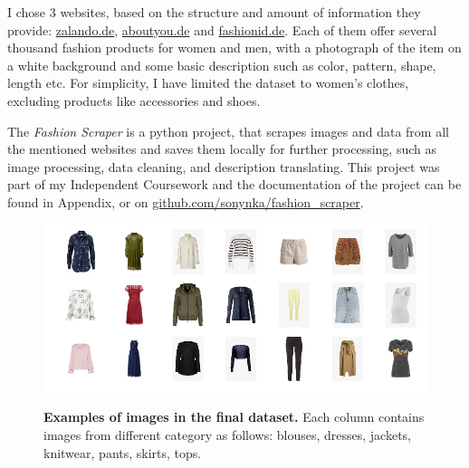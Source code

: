 \documentclass[12pt]{report}
\begin{document}
I chose 3 websites, based on the structure and amount of information they provide: \href{https://www.zalando.de/damen-home/}{zalando.de}, \href{https://www.aboutyou.de/}{aboutyou.de} and \href{https://www.fashionid.de/damen/}{fashionid.de}. Each of them offer several thousand fashion products for women and men, with a photograph of the item on a white background and some basic description such as color, pattern, shape, length etc. For simplicity, I have limited the dataset to women's clothes, excluding products like accessories and shoes.

The \textit{Fashion Scraper} is a python project, that scrapes images and data from all the mentioned websites and saves them locally for further processing, such as image processing, data cleaning, and description translating. This project was part of my Independent Coursework and the documentation of the project can be found in Appendix, or on \href{https://github.com/sonynka/fashion_scraper}{github.com/sonynka/fashion\_scraper}.

\begin{figure}[h]
\centering
{\includegraphics[width=\linewidth]{03_analysis/data/img_grid2}}
\caption{\label{fig:dataset} \textbf{Examples of images in the final dataset.} Each column contains images from different category as follows: blouses, dresses, jackets, knitwear, pants, skirts, tops.}
\end{figure}
\end{document}
